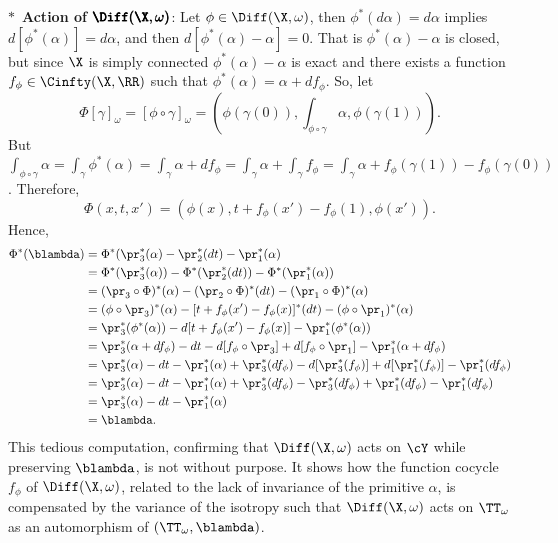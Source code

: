 \begin{article}
    $\ast$~\textbf{Action of $\pmb{\Diff(\X, \omega)}$}:
    Let $\phi \in \Diff(\X, \omega)$,
    then $\phi^*(d\alpha) = d\alpha$ implies $d[\phi^*(\alpha)] = d\alpha$,
    and then $d[\phi^*(\alpha)-\alpha] = 0$.
    That is $\phi^*(\alpha)-\alpha$ is closed,
    but since $\X$ is simply connected $\phi^*(\alpha)-\alpha$ is exact and there exists a function $f_\phi \in \Cinfty(\X,\RR)$ such that $\phi^*(\alpha) = \alpha + df_\phi$.
    So,
    let
    $$
      \Phi[\gamma]_\omega = [\phi \circ \gamma]_\omega = \left(\phi(\gamma(0)), \int_{\phi \circ \gamma} \alpha, \phi(\gamma(1))\right).
      $$
    But $\int_{\phi \circ \gamma} \alpha = \int_\gamma \phi^*(\alpha) = \int_\gamma \alpha + df_\phi = \int_\gamma \alpha + \int_\gamma f_\phi = \int_\gamma \alpha + f_\phi(\gamma(1)) - f_\phi(\gamma(0))$.
    Therefore,
    $$
      \Phi(x,t,x') = (\phi(x), t + f_\phi(x') - f_\phi(1), \phi(x')).
      $$
    Hence,
    \begin{align*}
      \Phi^*(\blambda) &= \Phi^*(\pr_3^*(\alpha) - \pr_2^*(dt) - \pr_1^*(\alpha) \\
      & =  \Phi^*(\pr_3^*(\alpha)) - \Phi^*(\pr_2^*(dt)) - \Phi^*(\pr_1^*(\alpha)) \\
      & = (\pr_3 \circ \Phi)^*(\alpha) - (\pr_2 \circ \Phi)^*(dt) - (\pr_1 \circ \Phi)^*(\alpha)\\
      & = (\phi \circ \pr_3)^*(\alpha) - [t + f_\phi(x') - f_\phi(x)]^*(dt) -(\phi \circ \pr_1)^*(\alpha) \\
      & = \pr_3^*(\phi^*(\alpha)) - d[t + f_\phi(x') - f_\phi(x)] - \pr_1^*(\phi^*(\alpha))\\
      & = \pr_3^*(\alpha + df_\phi) - dt - d[f_\phi \circ \pr_3] + d[f_\phi \circ \pr_1] - \pr_1^*(\alpha + df_\phi) \\
      & = \pr_3^*(\alpha) -dt - \pr_1^*(\alpha) + \pr_3^*(df_\phi) - d[\pr_3^*(f_\phi)] + d[\pr_1^*(f_\phi)] - \pr_1^*(df_\phi) \\
      & = \pr_3^*(\alpha) -dt - \pr_1^*(\alpha) + \pr_3^*(df_\phi) - \pr_3^*(df_\phi) + \pr_1^*(df_\phi) - \pr_1^*(df_\phi) \\
      & = \pr_3^*(\alpha) -dt - \pr_1^*(\alpha) \\
      & = \blambda.
    \end{align*}
    This tedious computation,
    confirming that $\Diff(\X, \omega)$ acts on $\cY$ while preserving $\blambda$,
    is not without purpose.
    It shows how the function cocycle $f_\phi$ of $\Diff(\X, \omega)$,
    related to the lack of invariance of the primitive $\alpha$,
    is compensated by the variance of the isotropy such that $\Diff(\X, \omega)$ acts on $\TT_\omega$ as an automorphism of $(\TT_\omega,\blambda)$.
    

\end{article}
